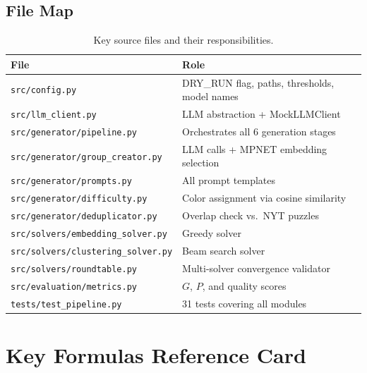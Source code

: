\documentclass[11pt, letterpaper]{article}
\begin{document}
\subsection{File Map}

\begin{table}[H]
\centering
\small
\caption{Key source files and their responsibilities.}
\begin{tabular}{@{}lp{8cm}@{}}
\toprule
File & Role \\
\midrule
\texttt{src/config.py} & DRY\_RUN flag, paths, thresholds, model names \\
\texttt{src/llm\_client.py} & LLM abstraction + MockLLMClient \\
\texttt{src/generator/pipeline.py} & Orchestrates all 6 generation stages \\
\texttt{src/generator/group\_creator.py} & LLM calls + MPNET embedding selection \\
\texttt{src/generator/prompts.py} & All prompt templates \\
\texttt{src/generator/difficulty.py} & Color assignment via cosine similarity \\
\texttt{src/generator/deduplicator.py} & Overlap check vs.\ NYT puzzles \\
\texttt{src/solvers/embedding\_solver.py} & Greedy solver \\
\texttt{src/solvers/clustering\_solver.py} & Beam search solver \\
\texttt{src/solvers/roundtable.py} & Multi-solver convergence validator \\
\texttt{src/evaluation/metrics.py} & $G$, $P$, and quality scores \\
\texttt{tests/test\_pipeline.py} & 31 tests covering all modules \\
\bottomrule
\end{tabular}
\end{table}

\section{Key Formulas Reference Card}
\end{document}
